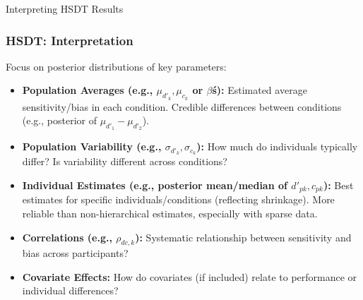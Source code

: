 \documentclass[aspectratio=169]{beamer}
\begin{document}
\begin{frame}{Interpreting HSDT Results}
    \frametitle{HSDT: Interpretation}
    Focus on posterior distributions of key parameters:
    \begin{itemize}
        \item \textbf{Population Averages (e.g., $\mu_{d'_k}, \mu_{c_k}$ or $\beta$\'s):}
            Estimated average sensitivity/bias in each condition. Credible differences between conditions (e.g., posterior of $\mu_{d'_1} - \mu_{d'_2}$).
        \pause
        \item \textbf{Population Variability (e.g., $\sigma_{d'_k}, \sigma_{c_k}$):}
            How much do individuals typically differ? Is variability different across conditions?
        \pause
        \item \textbf{Individual Estimates (e.g., posterior mean/median of $d'_{pk}, c_{pk}$):}
            Best estimates for specific individuals/conditions (reflecting shrinkage). More reliable than non-hierarchical estimates, especially with sparse data.
        \pause
        \item \textbf{Correlations (e.g., $\rho_{dc,k}$):}
            Systematic relationship between sensitivity and bias across participants?
        \pause
        \item \textbf{Covariate Effects:}
            How do covariates (if included) relate to performance or individual differences?
    \end{itemize}
\end{frame}
\end{document}
